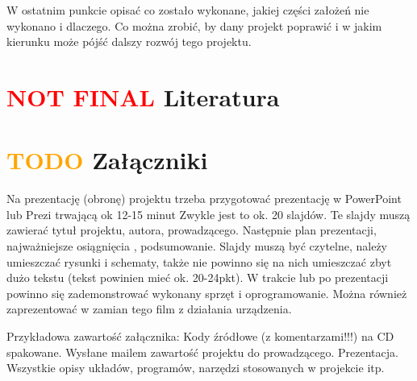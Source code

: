 \documentclass[11pt,titlepage]{article}
\begin{document}
W ostatnim punkcie opisać co zostało wykonane, jakiej części założeń nie wykonano i dlaczego. Co można zrobić, by dany projekt poprawić i w jakim kierunku może pójść dalszy rozwój tego projektu.

\section{\textcolor{red}{NOT FINAL}  Literatura}

\printbibliography[heading=none]

\section{\textcolor{orange}{TODO} Załączniki}

Na prezentację (obronę) projektu trzeba przygotować prezentację w PowerPoint lub Prezi trwającą ok 12-15 minut Zwykle jest to ok. 20 slajdów. Te slajdy muszą zawierać tytuł projektu, autora, prowadzącego. Następnie plan prezentacji, najważniejsze osiągnięcia , podsumowanie. Slajdy muszą być czytelne, należy umieszczać rysunki i schematy, także nie powinno się na nich umieszczać zbyt dużo tekstu (tekst powinien mieć ok. 20-24pkt). W trakcie lub po prezentacji powinno się zademonstrować wykonany sprzęt i oprogramowanie. Można również zaprezentować w zamian tego film z działania urządzenia.

Przykładowa zawartość załącznika:
Kody źródłowe (z komentarzami!!!) na CD spakowane.
Wysłane mailem zawartość projektu do prowadzącego.
Prezentacja.
Wszystkie opisy układów, programów, narzędzi stosowanych w projekcie itp.
\end{document}
